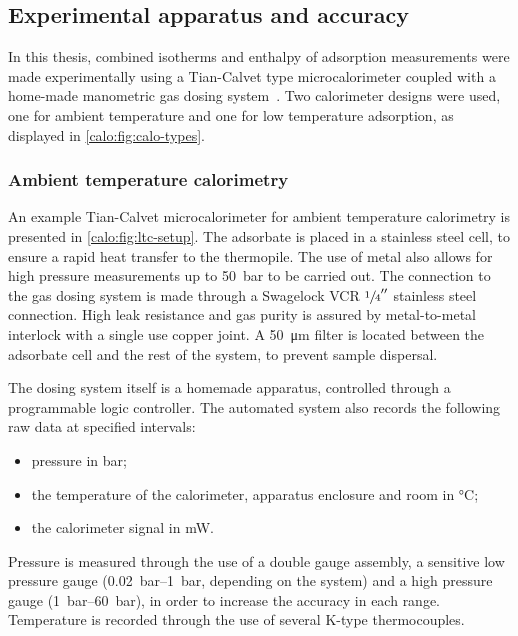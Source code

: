 \subsection{Experimental apparatus and accuracy}

In this thesis, combined isotherms and enthalpy of adsorption
measurements were made experimentally using a Tian-Calvet type
microcalorimeter coupled with a home-made manometric gas dosing
system~\cite{llewellynGasAdsorptionMicrocalorimetry2005}.
Two calorimeter designs were used, one for ambient temperature
and one for low temperature adsorption, as displayed in
\autoref{calo:fig:calo-types}.

\subsubsection{Ambient temperature calorimetry}\label{calo:rtc}

An example Tian-Calvet microcalorimeter for ambient temperature 
calorimetry is presented in \autoref{calo:fig:ltc-setup}. The 
adsorbate is placed in a stainless steel cell, to ensure a rapid 
heat transfer to the thermopile. The use of metal also allows for 
high pressure measurements up to \SI{50}{\bar} to be carried out.
The connection to the gas dosing system is made through a 
Swagelock VCR \(\sfrac{1}{4}''\)
stainless steel connection. High leak resistance and gas purity 
is assured by metal-to-metal interlock with a single use copper joint.
A \SI{50}{\micro\metre} filter is located between the adsorbate cell 
and the rest of the system, to prevent sample dispersal.

The dosing system itself is a homemade apparatus, controlled through 
a programmable logic controller. The automated system also records 
the following raw data at specified intervals:
\begin{itemize}
	\item pressure in \si{bar};
	\item the temperature of the calorimeter, apparatus enclosure and room in \si{\degreeCelsius};
	\item the calorimeter signal in \si{\milli\watt}.
\end{itemize}
Pressure is measured through the use of a double gauge assembly,
a sensitive low pressure gauge (\SIrange{0.02}{1}{\bar},
depending on the system) and a high pressure gauge (\SIrange{1}{60}{\bar}),
in order to increase the accuracy in each range. Temperature is
recorded through the use of several K-type thermocouples.

